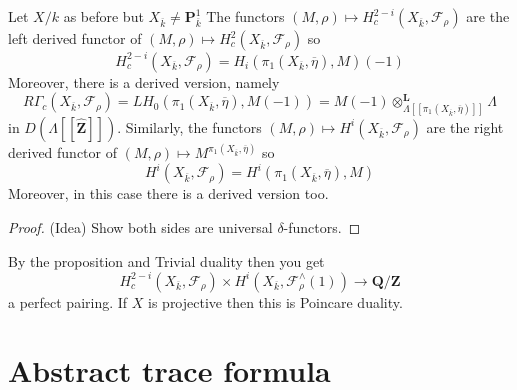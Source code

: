 \begin{proposition}
\label{proposition-curve-kpi1}
Let $X/k$ as before but $X_{\overline{k}}\neq \mathbf{P}^1_{\overline{k}}$
The functors
$
(M, \rho)\mapsto H_c^{2-i}(X_{\overline{k}}, \mathcal{F}_\rho)
$
are the left derived functor of
$(M, \rho)\mapsto H_c^2(X_{\overline{k}}, \mathcal{F}_\rho)$
so
$$
H_c^{2-i}(X_{\overline{k}}, \mathcal{F}_\rho) =
H_i(\pi_1(X_{\overline{k}}, \overline \eta), M)(-1)
$$
Moreover, there is a derived version, namely
$$
R\Gamma_c(X_{\overline{k}}, \mathcal{F}_\rho)
=
LH_0(\pi_1(X_{\overline{k}}, \overline \eta), M(-1))
=
M(-1)
\otimes_{\Lambda[[\pi_1(X_{\overline{k}}, \overline \eta)]]}^\mathbf{L}
\Lambda
$$
in $D(\Lambda[[\widehat{\mathbf{Z}}]])$.
Similarly, the functors
$(M, \rho)\mapsto H^i(X_{\overline{k}}, \mathcal{F}_\rho)$
are the right derived functor of
$(M, \rho)\mapsto M^{\pi_1(X_{\overline{k}}, \overline \eta)}$
so
$$
H^i(X_{\overline{k}}, \mathcal{F}_\rho) =
H^i(\pi_1(X_{\overline{k}}, \overline \eta), M)
$$
Moreover, in this case there is a derived version too.
\end{proposition}

\begin{proof}
(Idea) Show both sides are universal $\delta$-functors.
\end{proof}

\begin{remark}
\label{remark-poincare-groups}
By the proposition and Trivial duality then you get
$$
H^{2-i}_c(X_{\overline{k}}, \mathcal{F}_\rho)
\times
H^i(X_{\overline{k}}, \mathcal{F}_\rho^\wedge(1))
\to
\mathbf{Q}/\mathbf{Z}
$$
a perfect pairing. If $X$ is projective then this is Poincare duality.
\end{remark}





\section{Abstract trace formula}
\label{section-abstract-trace-formula}

